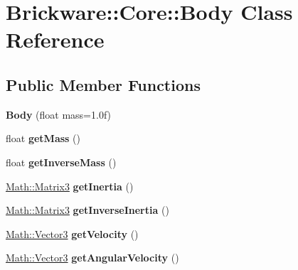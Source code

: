 \hypertarget{classBrickware_1_1Core_1_1Body}{}\section{Brickware\+:\+:Core\+:\+:Body Class Reference}
\label{classBrickware_1_1Core_1_1Body}
\subsection*{Public Member Functions}
\begin{DoxyCompactItemize}
\item 
\hypertarget{classBrickware_1_1Core_1_1Body_a9735db4b64f3a0a6e89cefd94e24b0fd}{}{\bfseries Body} (float mass=1.\+0f)\label{classBrickware_1_1Core_1_1Body_a9735db4b64f3a0a6e89cefd94e24b0fd}

\item 
\hypertarget{classBrickware_1_1Core_1_1Body_ad692a97bb5c2dd82cf5711da0cf444de}{}float {\bfseries get\+Mass} ()\label{classBrickware_1_1Core_1_1Body_ad692a97bb5c2dd82cf5711da0cf444de}

\item 
\hypertarget{classBrickware_1_1Core_1_1Body_a3909846e35e6b6192157c5a7de2bb95c}{}float {\bfseries get\+Inverse\+Mass} ()\label{classBrickware_1_1Core_1_1Body_a3909846e35e6b6192157c5a7de2bb95c}

\item 
\hypertarget{classBrickware_1_1Core_1_1Body_a7f2be1dc6ff55dbdf950aba43c8c3944}{}\hyperlink{classBrickware_1_1Math_1_1Matrix3}{Math\+::\+Matrix3} {\bfseries get\+Inertia} ()\label{classBrickware_1_1Core_1_1Body_a7f2be1dc6ff55dbdf950aba43c8c3944}

\item 
\hypertarget{classBrickware_1_1Core_1_1Body_a9c5a5cf44064498b8c225240b17478b7}{}\hyperlink{classBrickware_1_1Math_1_1Matrix3}{Math\+::\+Matrix3} {\bfseries get\+Inverse\+Inertia} ()\label{classBrickware_1_1Core_1_1Body_a9c5a5cf44064498b8c225240b17478b7}

\item 
\hypertarget{classBrickware_1_1Core_1_1Body_ade5ac62bd0bf6e9302f582d23f297492}{}\hyperlink{classBrickware_1_1Math_1_1Vector3}{Math\+::\+Vector3} {\bfseries get\+Velocity} ()\label{classBrickware_1_1Core_1_1Body_ade5ac62bd0bf6e9302f582d23f297492}

\item 
\hypertarget{classBrickware_1_1Core_1_1Body_acd308033a03e34b03a68705347206c63}{}\hyperlink{classBrickware_1_1Math_1_1Vector3}{Math\+::\+Vector3} {\bfseries get\+Angular\+Velocity} ()\label{classBrickware_1_1Core_1_1Body_acd308033a03e34b03a68705347206c63}


\end{DoxyCompactItemize}
